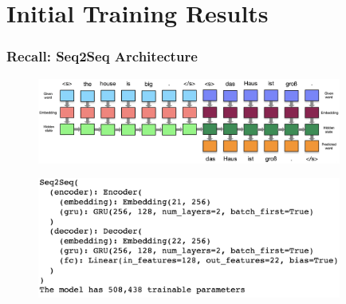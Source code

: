 \documentclass[usenames,dvipsnames]{beamer}
\begin{document}
\section{Initial Training Results}

\begin{frame}
  \frametitle{Recall: Seq2Seq Architecture}
  \begin{figure}
    \centering
    \includegraphics[width=10cm, valign=c]{assets/enc-dec}
  \end{figure}
  \begin{figure}
    \centering
    \includegraphics[width=10cm, valign=c]{assets/col-seq2seq}
  \end{figure}
\end{frame}
\end{document}
